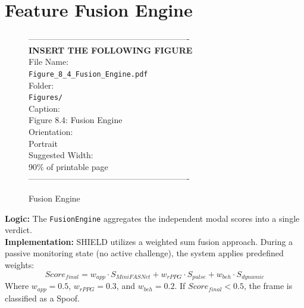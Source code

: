 \documentclass[12pt, a4paper]{report}
\begin{document}
\section{Feature Fusion Engine}
\vspace{1em}
\begin{figure}[htbp]
\begin{center}
----------------------------------------------------------\\
\vspace{0.5em}
\textbf{INSERT THE FOLLOWING FIGURE}\\
\vspace{1em}
File Name:\\
\texttt{Figure\_8\_4\_Fusion\_Engine.pdf}\\
\vspace{1em}
Folder:\\
\texttt{Figures/}\\
\vspace{1em}
Caption:\\
Figure 8.4: Fusion Engine\\
\vspace{1em}
Orientation:\\
Portrait\\
\vspace{1em}
Suggested Width:\\
90\% of printable page\\
\vspace{3cm}
----------------------------------------------------------
\end{center}
\caption{Fusion Engine}
\label{fig:diag_6}
\end{figure}
\vspace{1em}
\textbf{Logic:} The \texttt{FusionEngine} aggregates the independent modal scores into a single verdict. \\
\textbf{Implementation:} SHIELD utilizes a weighted sum fusion approach. During a passive monitoring state (no active challenge), the system applies predefined weights:
\begin{equation}
Score_{final} = w_{app} \cdot S_{MiniFASNet} + w_{rPPG} \cdot S_{pulse} + w_{beh} \cdot S_{dynamic}
\end{equation}
Where $w_{app} = 0.5$, $w_{rPPG} = 0.3$, and $w_{beh} = 0.2$. If $Score_{final} < 0.5$, the frame is classified as a Spoof.
\end{document}
